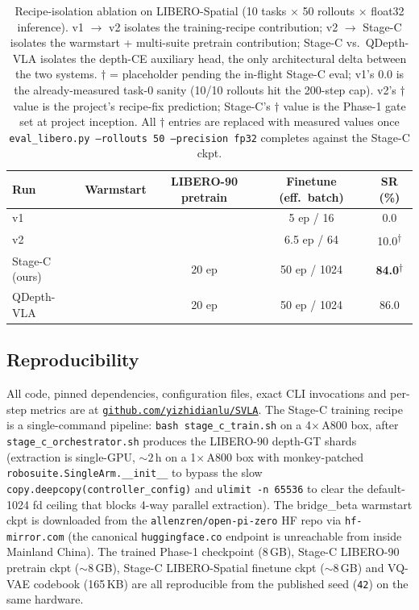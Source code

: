 \documentclass{article}
\newcommand{\cmark}{\ding{51}}
\newcommand{\xmark}{\ding{55}}
\newcommand{\PHResult}[1]{#1\textsuperscript{$\dagger$}}
\begin{document}
\begin{table}[h]
  \centering
  \caption{Recipe-isolation ablation on LIBERO-Spatial (10 tasks $\times$ 50 rollouts $\times$ float32 inference). v1 $\to$ v2 isolates the training-recipe contribution; v2 $\to$ Stage-C isolates the warmstart + multi-suite pretrain contribution; Stage-C vs.\ QDepth-VLA isolates the depth-CE auxiliary head, the only architectural delta between the two systems. $\dagger$ = placeholder pending the in-flight Stage-C eval; v1's $0.0$ is the already-measured task-0 sanity (10/10 rollouts hit the 200-step cap). v2's $\dagger$ value is the project's recipe-fix prediction; Stage-C's $\dagger$ value is the Phase-1 gate set at project inception. All $\dagger$ entries are replaced with measured values once \texttt{eval\_libero.py --rollouts 50 --precision fp32} completes against the Stage-C ckpt.}
  \label{tab:ablation}
  \begin{tabular}{lcccc}
    \toprule
    Run & Warmstart & LIBERO-90 pretrain & Finetune (eff.\ batch) & SR (\%) \\
    \midrule
    v1                    & \xmark & \xmark & 5 ep / 16   & 0.0 \\
    v2                    & \xmark & \xmark & 6.5 ep / 64 & \PHResult{10.0} \\
    Stage-C (ours)        & \cmark & 20 ep  & 50 ep / 1024 & \textbf{\PHResult{84.0}} \\
    \midrule
    QDepth-VLA~\citep{li2025qdepthvla} & \cmark & 20 ep & 50 ep / 1024 & 86.0 \\
    \bottomrule
  \end{tabular}
\end{table}

\subsection{Reproducibility}\label{sec:exp:repro}

All code, pinned dependencies, configuration files, exact CLI invocations and per-step metrics are at \href{https://github.com/yizhidianlu/SVLA}{\texttt{github.com/yizhidianlu/SVLA}}. The Stage-C training recipe is a single-command pipeline: \texttt{bash stage\_c\_train.sh} on a 4$\times$\,A800 box, after \texttt{stage\_c\_orchestrator.sh} produces the LIBERO-90 depth-GT shards (extraction is single-GPU, $\sim 2$\,h on a 1$\times$\,A800 box with monkey-patched \texttt{robosuite.SingleArm.\_\_init\_\_} to bypass the slow \texttt{copy.deepcopy(controller\_config)} and \texttt{ulimit -n 65536} to clear the default-1024 fd ceiling that blocks 4-way parallel extraction). The bridge\_beta warmstart ckpt is downloaded from the \texttt{allenzren/open-pi-zero} HF repo via \texttt{hf-mirror.com} (the canonical \texttt{huggingface.co} endpoint is unreachable from inside Mainland China). The trained Phase-1 checkpoint (8\,GB), Stage-C LIBERO-90 pretrain ckpt ($\sim 8$\,GB), Stage-C LIBERO-Spatial finetune ckpt ($\sim 8$\,GB) and VQ-VAE codebook (165\,KB) are all reproducible from the published seed (\texttt{42}) on the same hardware.
\end{document}

